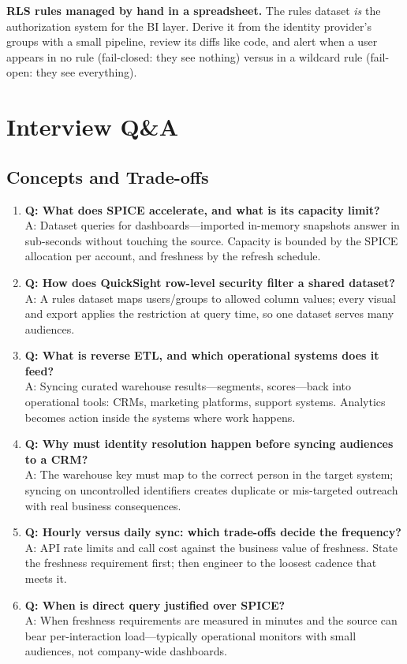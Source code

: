 \begin{pitfall}
\textbf{RLS rules managed by hand in a spreadsheet.} The rules dataset \emph{is} the authorization system for the BI layer. Derive it from the identity provider's groups with a small pipeline, review its diffs like code, and alert when a user appears in no rule (fail-closed: they see nothing) versus in a wildcard rule (fail-open: they see everything).
\end{pitfall}

\section{Interview Q\&A}
\subsection{Concepts and Trade-offs}
\begin{enumerate}
    \item \textbf{Q: What does SPICE accelerate, and what is its capacity limit?}\\
    A: Dataset queries for dashboards---imported in-memory snapshots answer in sub-seconds without touching the source. Capacity is bounded by the SPICE allocation per account, and freshness by the refresh schedule.
    \item \textbf{Q: How does QuickSight row-level security filter a shared dataset?}\\
    A: A rules dataset maps users/groups to allowed column values; every visual and export applies the restriction at query time, so one dataset serves many audiences.
    \item \textbf{Q: What is reverse ETL, and which operational systems does it feed?}\\
    A: Syncing curated warehouse results---segments, scores---back into operational tools: CRMs, marketing platforms, support systems. Analytics becomes action inside the systems where work happens.
    \item \textbf{Q: Why must identity resolution happen before syncing audiences to a CRM?}\\
    A: The warehouse key must map to the correct person in the target system; syncing on uncontrolled identifiers creates duplicate or mis-targeted outreach with real business consequences.
    \item \textbf{Q: Hourly versus daily sync: which trade-offs decide the frequency?}\\
    A: API rate limits and call cost against the business value of freshness. State the freshness requirement first; then engineer to the loosest cadence that meets it.
    \item \textbf{Q: When is direct query justified over SPICE?}\\
    A: When freshness requirements are measured in minutes and the source can bear per-interaction load---typically operational monitors with small audiences, not company-wide dashboards.
\end{enumerate}

